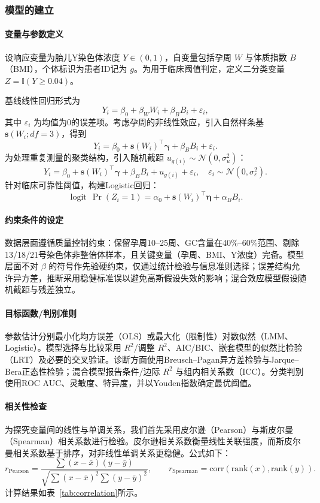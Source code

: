 \documentclass[withoutpreface]{cumcmthesis}
\begin{document}
\subsubsection{模型的建立}
\paragraph{变量与参数定义}
设响应变量为胎儿Y染色体浓度 $Y\in(0,1)$，自变量包括孕周 $W$ 与体质指数 $B$（BMI），个体标识为患者ID记为 $g$。为用于临床阈值判定，定义二分类变量 $Z=\mathbb{I}(Y\ge 0.04)$。

基线线性回归形式为
\[
Y_i=\beta_0+\beta_W W_i+\beta_B B_i+\varepsilon_i,
\]
其中 $\varepsilon_i$ 为均值为0的误差项。考虑孕周的非线性效应，引入自然样条基 $\mathbf{s}(W_i;df=3)$，得到
\[
Y_i=\beta_0+\mathbf{s}(W_i)^\top\boldsymbol{\gamma}+\beta_B B_i+\varepsilon_i.
\]
为处理重复测量的聚类结构，引入随机截距 $u_{g(i)}\sim\mathcal{N}(0,\sigma_u^2)$：
\[
Y_i=\beta_0+\mathbf{s}(W_i)^\top\boldsymbol{\gamma}+\beta_B B_i+u_{g(i)}+\varepsilon_i,\quad \varepsilon_i\sim\mathcal{N}(0,\sigma_\varepsilon^2).
\]
针对临床可靠性阈值，构建Logistic回归：
\[
\operatorname{logit}\,\Pr(Z_i=1)=\alpha_0+\mathbf{s}(W_i)^\top\boldsymbol{\eta}+\alpha_B B_i.
\]
\paragraph{约束条件的设定}
数据层面遵循质量控制约束：保留孕周10–25周、GC含量在40\%–60\%范围、剔除13/18/21号染色体非整倍体样本，且关键变量（孕周、BMI、Y浓度）完备。模型层面不对 $\beta$ 的符号作先验硬约束，仅通过统计检验与信息准则选择；误差结构允许异方差，推断采用稳健标准误以避免高斯假设失效的影响；混合效应模型假设随机截距与残差独立。
\paragraph{目标函数/判别准则}
参数估计分别最小化均方误差（OLS）或最大化（限制性）对数似然（LMM、Logistic）。模型选择与比较采用 $R^2$/调整 $R^2$、AIC/BIC、嵌套模型的似然比检验（LRT）及必要的交叉验证。诊断方面使用Breusch–Pagan异方差检验与Jarque–Bera正态性检验；混合模型报告条件/边际 $R^2$ 与组内相关系数（ICC）。分类判别使用ROC AUC、灵敏度、特异度，并以Youden指数确定最优阈值。
\paragraph{相关性检查}
为探究变量间的线性与单调关系，我们首先采用皮尔逊（Pearson）与斯皮尔曼（Spearman）相关系数进行检验。皮尔逊相关系数衡量线性关联强度，而斯皮尔曼相关系数基于排序，对非线性单调关系更稳健。公式如下：
$$
r_{\text{Pearson}}=\frac{\sum (x-\bar x)(y-\bar y)}{\sqrt{\sum(x-\bar x)^2\sum(y-\bar y)^2}},\qquad
r_{\text{Spearman}}=\text{corr}(\text{rank}(x),\text{rank}(y)).
$$
计算结果如表~\ref{tab:correlation}所示。
\end{document}
